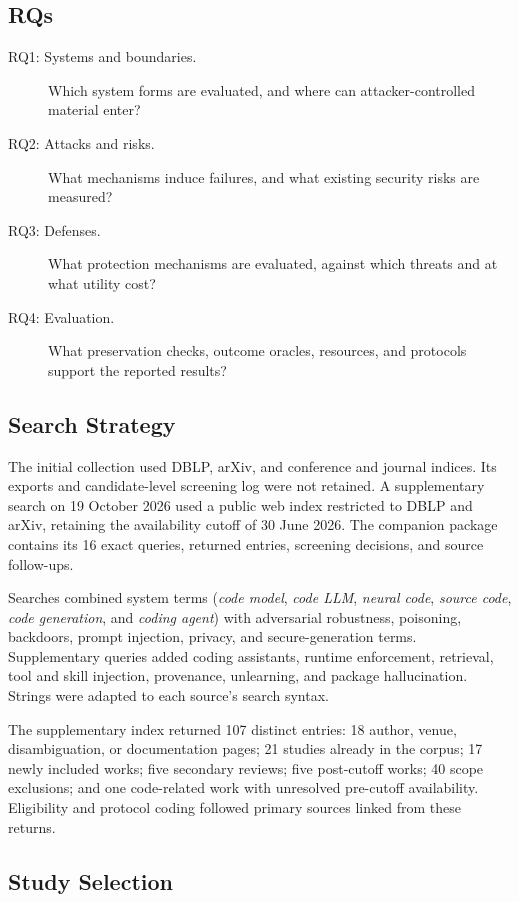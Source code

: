\documentclass[acmsmall,screen,review,nonacm]{acmart}
\begin{document}
\subsection{RQs}
\label{sec:rqs}
\begin{description}
\item[RQ1: Systems and boundaries.] Which system forms are evaluated, and where can attacker-controlled material enter?
\item[RQ2: Attacks and risks.] What mechanisms induce failures, and what existing security risks are measured?
\item[RQ3: Defenses.] What protection mechanisms are evaluated, against which threats and at what utility cost?
\item[RQ4: Evaluation.] What preservation checks, outcome oracles, resources, and protocols support the reported results?
\end{description}

\subsection{Search Strategy}
The initial collection used DBLP, arXiv, and conference and journal indices. Its exports and candidate-level screening log were not retained. A supplementary search on 19 October 2026 used a public web index restricted to DBLP and arXiv, retaining the availability cutoff of 30 June 2026. The companion package contains its 16 exact queries, returned entries, screening decisions, and source follow-ups.

Searches combined system terms (\emph{code model}, \emph{code LLM}, \emph{neural code}, \emph{source code}, \emph{code generation}, and \emph{coding agent}) with adversarial robustness, poisoning, backdoors, prompt injection, privacy, and secure-generation terms. Supplementary queries added coding assistants, runtime enforcement, retrieval, tool and skill injection, provenance, unlearning, and package hallucination. Strings were adapted to each source's search syntax.

The supplementary index returned 107 distinct entries: 18 author, venue, disambiguation, or documentation pages; 21 studies already in the corpus; 17 newly included works; five secondary reviews; five post-cutoff works; 40 scope exclusions; and one code-related work with unresolved pre-cutoff availability. Eligibility and protocol coding followed primary sources linked from these returns.

\subsection{Study Selection}
\end{document}
